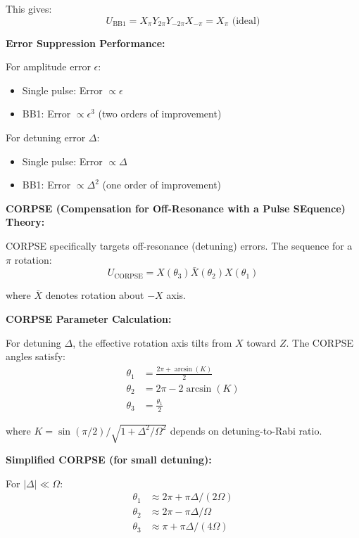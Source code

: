 \documentclass[11pt,a4paper]{article}
\theoremstyle{definition}
\theoremstyle{remark}
\begin{document}
This gives:
\begin{equation}
U_{\text{BB1}} = X_\pi Y_{2\pi} Y_{-2\pi} X_{-\pi} = X_\pi \text{ (ideal)}
\end{equation}

\textbf{Error Suppression Performance:}

For amplitude error $\epsilon$:
\begin{itemize}
    \item Single pulse: Error $\propto \epsilon$
    \item BB1: Error $\propto \epsilon^3$ (two orders of improvement)
\end{itemize}

For detuning error $\Delta$:
\begin{itemize}
    \item Single pulse: Error $\propto \Delta$
    \item BB1: Error $\propto \Delta^2$ (one order of improvement)
\end{itemize}

\textbf{CORPSE (Compensation for Off-Resonance with a Pulse SEquence) Theory:}

CORPSE specifically targets off-resonance (detuning) errors. The sequence for a $\pi$ rotation:
\begin{equation}
U_{\text{CORPSE}} = X(\theta_3) \bar{X}(\theta_2) X(\theta_1)
\end{equation}

where $\bar{X}$ denotes rotation about $-X$ axis.

\textbf{CORPSE Parameter Calculation:}

For detuning $\Delta$, the effective rotation axis tilts from $X$ toward $Z$. The CORPSE angles satisfy:
\begin{align}
\theta_1 &= \frac{2\pi + \arcsin(K)}{2} \\
\theta_2 &= 2\pi - 2\arcsin(K) \\
\theta_3 &= \frac{\theta_1}{2}
\end{align}

where $K = \sin(\pi/2)/\sqrt{1+\Delta^2/\Omega^2}$ depends on detuning-to-Rabi ratio.

\textbf{Simplified CORPSE (for small detuning):}

For $|\Delta| \ll \Omega$:
\begin{align}
\theta_1 &\approx 2\pi + \pi\Delta/(2\Omega) \\
\theta_2 &\approx 2\pi - \pi\Delta/\Omega \\
\theta_3 &\approx \pi + \pi\Delta/(4\Omega)
\end{align}
\end{document}
